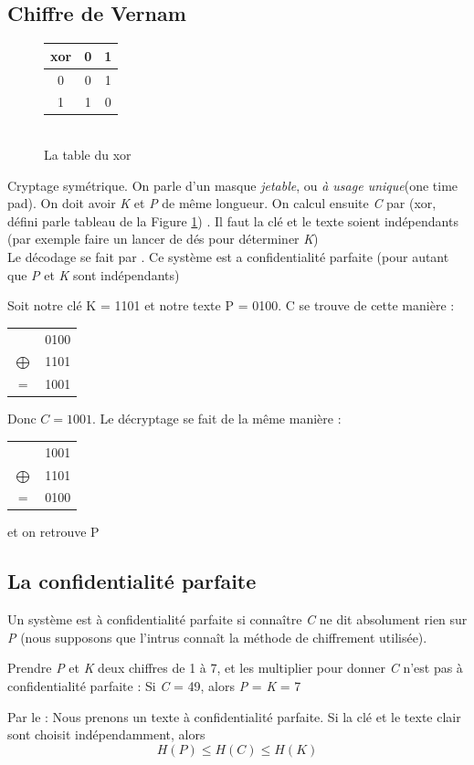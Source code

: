 \documentclass[11pt,a4paper]{article}
\renewcommand{\)}{\right)}
\renewcommand{\(}{\left(}
\begin{document}
\subsection{Chiffre de Vernam}
\begin{figure}
	\centering
	\captionsetup{justification=centering}
	\begin{tabular}{c|cc}
		xor & 0 & 1\\
		\hline
		0 & 0 & 1\\
		1 & 1 & 0
	\end{tabular}
	\caption{\\La table du xor}
	\label{xor}
\end{figure}
Cryptage symétrique. On parle d'un masque \textit{jetable}, ou \textit{à usage unique}(one time pad). On doit avoir \textit{K} et \textit{P} de même longueur. On calcul ensuite \textit{C} par  (xor, défini parle tableau de la Figure \ref{xor}) . Il faut la clé et le texte soient indépendants (par exemple faire un lancer de dés pour déterminer \textit{K})\\
Le décodage se fait par . Ce système est a confidentialité parfaite (pour autant que \textit{P} et \textit{K} sont indépendants)
\begin{exemple}
Soit notre clé K = 1101 et notre texte P = 0100. C se trouve de cette manière :
\begin{tabular}{c c}
	& 0100\\
	$\bigoplus$ & 	1101\\
	\hline
	= & 1001
\end{tabular}
Donc $C = 1001$. Le décryptage se fait de la même manière : 
\begin{tabular}{c c}
	& 1001\\
	$\bigoplus$ & 	1101\\
	\hline
	= & 0100
\end{tabular} et on retrouve P 	
\end{exemple}
\subsection{La confidentialité parfaite}
Un système est à confidentialité parfaite si connaître \textit{C} ne dit absolument rien sur \textit{P} (nous supposons que l'intrus connaît la méthode de chiffrement utilisée). 
\begin{exemple}
	Prendre \textit{P} et \textit{K} deux chiffres de 1 à 7, et les multiplier pour donner \textit{C} n'est pas à confidentialité parfaite : Si \textit{C} = 49, alors \textit{P} = \textit{K} = 7
\end{exemple}
Par le  : Nous prenons un texte à confidentialité parfaite. Si la clé et le texte clair sont choisit indépendamment, alors 
\begin{equation*}
	H(P) \leq H(C) \leq H(K)
\end{equation*}
\end{document}
